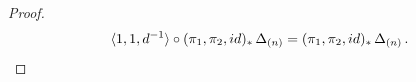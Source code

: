 \documentclass[10pt,a4paper]{amsart}
\begin{document}
\begin{proof}
\begin{equation}
\label{eqn_2025_07_02_1642}
\langle 1,1,d^{-1}\rangle \circ (\pi_1,\pi_2,{\rm id})_*\,\Delta_{(n)}=(\pi_1,\pi_2,{\rm id})_*\,\Delta_{(n)}\,. 
\end{equation}






\end{proof}
\end{document}
